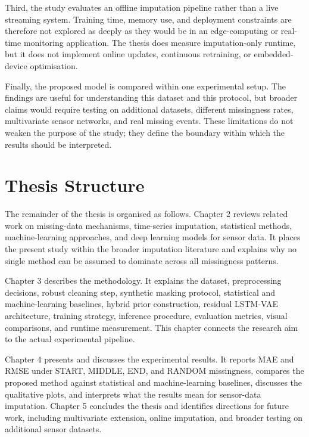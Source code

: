 Third, the study evaluates an offline imputation pipeline rather than a live streaming system. Training time, memory use, and deployment constraints are therefore not explored as deeply as they would be in an edge-computing or real-time monitoring application. The thesis does measure imputation-only runtime, but it does not implement online updates, continuous retraining, or embedded-device optimisation.

Finally, the proposed model is compared within one experimental setup. The findings are useful for understanding this dataset and this protocol, but broader claims would require testing on additional datasets, different missingness rates, multivariate sensor networks, and real missing events. These limitations do not weaken the purpose of the study; they define the boundary within which the results should be interpreted.

\section{Thesis Structure}
The remainder of the thesis is organised as follows. Chapter 2 reviews related work on missing-data mechanisms, time-series imputation, statistical methods, machine-learning approaches, and deep learning models for sensor data. It places the present study within the broader imputation literature and explains why no single method can be assumed to dominate across all missingness patterns.

Chapter 3 describes the methodology. It explains the dataset, preprocessing decisions, robust cleaning step, synthetic masking protocol, statistical and machine-learning baselines, hybrid prior construction, residual LSTM-VAE architecture, training strategy, inference procedure, evaluation metrics, visual comparisons, and runtime measurement. This chapter connects the research aim to the actual experimental pipeline.

Chapter 4 presents and discusses the experimental results. It reports MAE and RMSE under START, MIDDLE, END, and RANDOM missingness, compares the proposed method against statistical and machine-learning baselines, discusses the qualitative plots, and interprets what the results mean for sensor-data imputation. Chapter 5 concludes the thesis and identifies directions for future work, including multivariate extension, online imputation, and broader testing on additional sensor datasets.
